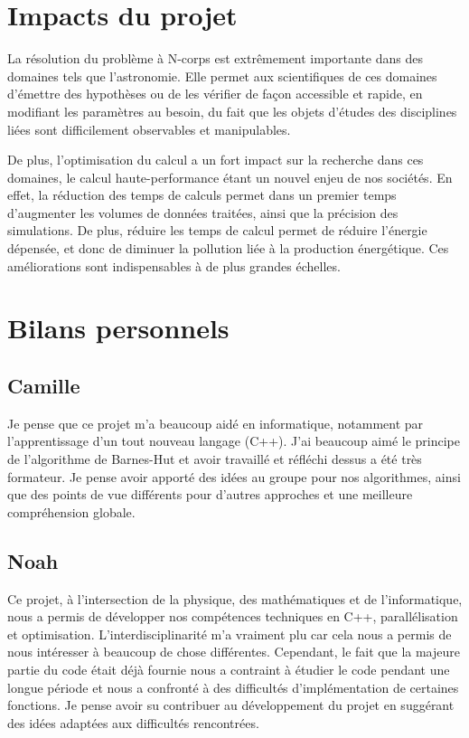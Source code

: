 \section{Impacts du projet}

La résolution du problème à N-corps est extrêmement importante dans des domaines tels que l'astronomie. Elle permet aux scientifiques de ces domaines d'émettre des hypothèses ou de les vérifier de façon accessible et rapide, en modifiant les paramètres au besoin, du fait que les objets d'études des disciplines liées sont difficilement observables et manipulables.

\vspace{2mm}
De plus, l'optimisation du calcul a un fort impact sur la recherche dans ces domaines, le calcul haute-performance étant un nouvel enjeu de nos sociétés. En effet, la réduction des temps de calculs permet dans un premier temps d'augmenter les volumes de données traitées, ainsi que la précision des simulations. De plus, réduire les temps de calcul permet de réduire l'énergie dépensée, et donc de diminuer la pollution liée à la production énergétique. Ces améliorations sont indispensables à de plus grandes échelles. 

\section{Bilans personnels}

\subsection{Camille}

Je pense que ce projet m’a beaucoup aidé en informatique,
notamment par l'apprentissage d’un tout nouveau langage (C++).
J’ai beaucoup aimé le principe de l’algorithme de Barnes-Hut et
avoir travaillé et réfléchi dessus a été très formateur. Je pense
avoir apporté des idées au groupe pour nos algorithmes, ainsi que
des points de vue différents pour d’autres approches et une
meilleure compréhension globale.

\subsection{Noah}

Ce projet, à l'intersection de la physique, des mathématiques et de l'informatique, nous a permis de développer nos compétences techniques en C++, parallélisation et optimisation. L'interdisciplinarité m'a vraiment plu car cela nous a permis de nous intéresser à beaucoup de chose différentes. Cependant, le fait que la majeure partie du code était déjà fournie nous a contraint à étudier le code pendant une longue période et nous a confronté à des difficultés d'implémentation de certaines fonctions. Je pense avoir su contribuer au développement du projet en suggérant des idées adaptées aux difficultés rencontrées.

